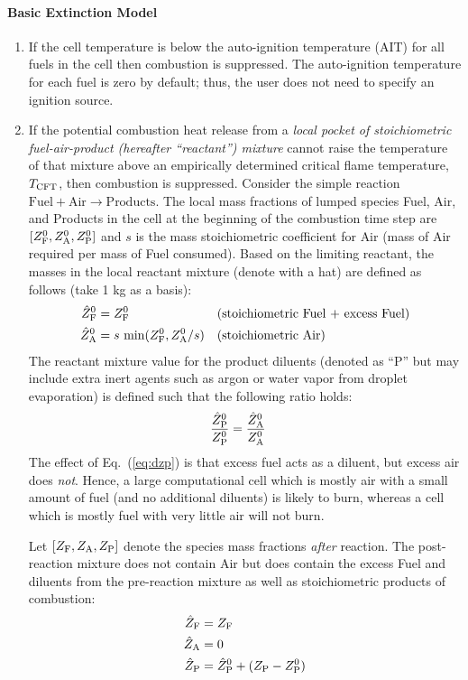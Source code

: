 \paragraph{Basic Extinction Model}
\begin{enumerate}
\item If the cell temperature is below the auto-ignition temperature (AIT) for all fuels in the cell then combustion is suppressed. The auto-ignition temperature for each fuel is zero by default; thus, the user does not need to specify an ignition source.
\item If the potential combustion heat release from a \emph{local pocket of stoichiometric fuel-air-product (hereafter ``reactant'') mixture} cannot raise the temperature of that mixture above an empirically determined critical flame temperature, $T_{\rm CFT}$, then combustion is suppressed.  Consider the simple reaction $\mbox{Fuel} + \mbox{Air} \rightarrow \mbox{Products}$. The local mass fractions of lumped species Fuel, Air, and Products in the cell at the beginning of the combustion time step are $[Z_{\rm F}^0, Z_{\rm A}^0, Z_{\rm P}^0]$ and $s$ is the mass stoichiometric coefficient for Air (mass of Air required per mass of Fuel consumed). Based on the limiting reactant, the masses in the local reactant mixture (denote with a hat) are defined as follows (take 1 kg as a basis):
\begin{align}
\label{eq:dzf} \hat{Z}_{\rm F}^0 &= Z_{\rm F}^0  && \mbox{(stoichiometric Fuel + excess Fuel)} \\
\label{eq:dza} \hat{Z}_{\rm A}^0 &= s \, \min(Z_{\rm F}^0,Z_{\rm A}^0/s) && \mbox{(stoichiometric Air)}
\end{align}
The reactant mixture value for the product diluents (denoted as ``P'' but may include extra inert agents such as argon or water vapor from droplet evaporation) is defined such that the following ratio holds:
\begin{align}
\label{eq:dzp} \frac{\hat{Z}_{\rm P}^0}{Z_{\rm P}^0} &= \frac{\hat{Z}_{\rm A}^0}{Z_{\rm A}^0}
\end{align}
The effect of Eq.~(\ref{eq:dzp}) is that excess fuel acts as a diluent, but excess air does \emph{not}.  Hence, a large computational cell which is mostly air with a small amount of fuel (and no additional diluents) is likely to burn, whereas a cell which is mostly fuel with very little air will not burn.

Let $[Z_{\rm F}, Z_{\rm A}, Z_{\rm P}]$ denote the species mass fractions \emph{after} reaction. The post-reaction mixture does not contain Air but does contain the excess Fuel and diluents from the pre-reaction mixture as well as stoichiometric products of combustion:
\begin{align}
\label{eq:dzfbar} \hat{Z}_{\rm F} &= Z_{\rm F} \\
\label{eq:dzabar} \hat{Z}_{\rm A} &= 0 \\
\label{eq:dzpbar} \hat{Z}_{\rm P} &= \hat{Z}_{\rm P}^0 + (Z_{\rm P} - Z_{\rm P}^0)
\end{align}


\end{enumerate}
